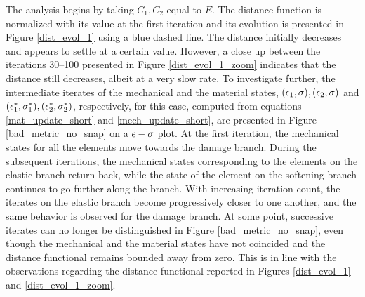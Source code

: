 \documentclass[10pt]{cas-sc}
\newcommand{\deleted}[1]{}
\newcommand{\added}[1]{#1}
\begin{document}
The analysis begins by taking $C_1,C_2$ equal to $E$. \added{The distance function is normalized with its value at the first iteration and its evolution is presented in Figure \ref{dist_evol_1} using a blue dashed line. The distance initially decreases and appears to settle at a certain value. However, a close up between the iterations 30--100 presented in Figure \ref{dist_evol_1_zoom} indicates that the distance still decreases, albeit at a very slow rate. To investigate further,} the intermediate iterates of the mechanical and the material states, $({\epsilon}_1,{\sigma}),({\epsilon}_2,{\sigma})$ and $({\epsilon}^*_1,{\sigma}_1^*),({\epsilon}^*_2,{\sigma}^*_2)$, respectively, for this case, computed from equations \eqref{mat_update_short} and \eqref{mech_update_short}, are presented in Figure \ref{bad_metric_no_snap} on a $\epsilon-{\sigma}$ plot. \deleted{The zoom-in of the first few iterations is presented in Figure \ref{bad_metric_no_snap_zoom}.} At the first iteration, the mechanical states for all the elements move towards the damage branch. During the subsequent iterations, the mechanical states corresponding to the elements on the elastic branch return back, while the state of the element on the softening branch continues to go further along the branch. With increasing iteration count, the iterates on the elastic branch become progressively closer to one another, and the same behavior is observed for the damage branch. At some point, successive iterates can no longer be distinguished in Figure \ref{bad_metric_no_snap}, even though the mechanical and the material states \deleted{are still further apart and the distance functional still assumes higher values}\added{have not coincided and the distance functional remains bounded away from zero}.
\deleted{At some point, successive iterates can no longer be distinguished in Figure \ref{bad_metric_no_snap}, even though the mechanical and the material states are still further apart and the distance functional still assumes higher values. }\added{This is in line with the observations regarding the distance functional reported in Figures \ref{dist_evol_1} and \ref{dist_evol_1_zoom}.}
\end{document}
